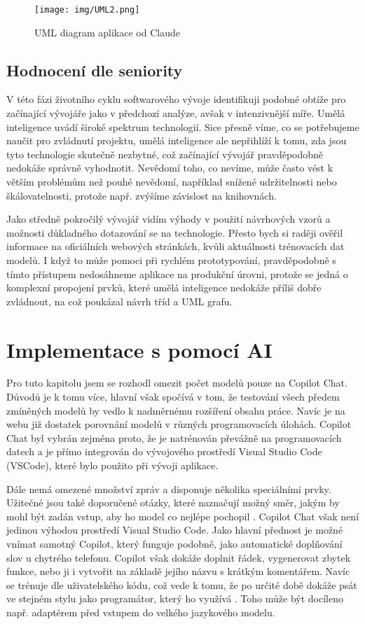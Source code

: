 \documentclass[FM,DP]{tulthesis}
\begin{document}
		\begin{figure}[H]
			\centering
			\texttt{[image: img/UML2.png]}
			\caption{UML diagram aplikace od Claude \cite{general}}
			\label{fig:claude_uml}
		\end{figure}
		
		\subsection{Hodnocení dle seniority}
		V této fázi životního cyklu softwarového vývoje identifikuji podobné obtíže pro začínající vývojáře jako v předchozí analýze, avšak v intenzivnější míře. Umělá inteligence uvádí široké spektrum technologií. Sice přesně víme, co se potřebujeme naučit pro zvládnutí projektu, umělá inteligence ale nepřihlíží k tomu, zda jsou tyto technologie skutečně nezbytné, což začínající vývojář pravděpodobně nedokáže správně vyhodnotit. Nevědomí toho, co nevíme, může často vést k větším problémům než pouhé nevědomí, například snížené udržitelnosti nebo škálovatelnosti, protože např. zvýšíme závislost na knihovnách.
		
		Jako středně pokročilý vývojář vidím výhody v použití návrhových vzorů a možnosti důkladného dotazování se na technologie. Přesto bych si raději ověřil informace na oficiálních webových stránkách, kvůli aktuálnosti trénovacích dat modelů. I když to může pomoci při rychlém prototypování, pravděpodobně s tímto přístupem nedosáhneme aplikace na produkční úrovni, protože se jedná o komplexní propojení prvků, které umělá inteligence nedokáže příliš dobře zvládnout, na což poukázal návrh tříd a UML grafu.
		
		\section{Implementace s pomocí AI}
		Pro tuto kapitolu jsem se rozhodl omezit počet modelů pouze na Copilot Chat. Důvodů je k tomu více, hlavní však spočívá v tom, že testování všech předem zmíněných modelů by vedlo k nadměrnému rozšíření obsahu práce. Navíc je na webu již dostatek porovnání modelů v různých programovacích úlohách. Copilot Chat byl vybrán zejména proto, že je natrénován převážně na programovacích datech a je přímo integrován do vývojového prostředí Visual Studio Code (VSCode), které bylo použito při vývoji aplikace. 

    Dále nemá omezené množství zpráv a disponuje několika speciálními prvky. Užitečné jsou také doporučené otázky, které naznačují možný směr, jakým by mohl být zadán vstup, aby ho model co nejlépe pochopil \cite{gitCopilot}. Copilot Chat však není jedinou výhodou prostředí Visual Studio Code. Jako hlavní přednost je možné vnímat samotný Copilot, který funguje podobně, jako automatické doplňování slov u chytrého telefonu. Copilot však dokáže doplnit řádek, vygenerovat zbytek funkce, nebo ji i vytvořit na základě jejího názvu s krátkým komentářem. Navíc se trénuje dle uživatelského kódu, což vede k tomu, že po určité době dokáže psát ve stejném stylu jako programátor, který ho využívá \cite{gitCopilot}. Toho může být docíleno např. adaptérem před vstupem do velkého jazykového modelu.
		
\end{document}
